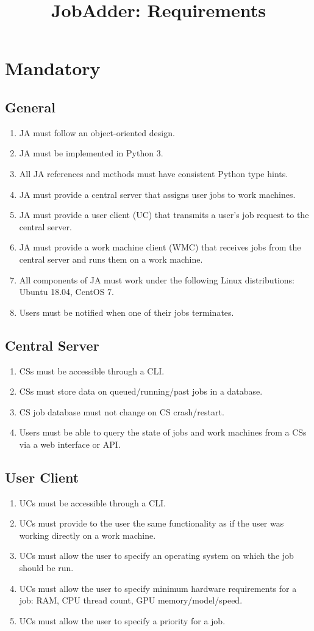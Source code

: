\documentclass[a4paper,10pt]{article}
\title{JobAdder: Requirements}
\author{}
\begin{document}
\maketitle

\section{Mandatory}
\subsection{General}
\begin{enumerate}
 \item JA must follow an object-oriented design.
 \item JA must be implemented in Python 3.
 \item All JA references and methods must have consistent Python type hints.
 \item JA must provide a central server that assigns user jobs to work machines.
 \item JA must provide a user client (UC) that transmits a user's job request to the central server.
 \item JA must provide a work machine client (WMC) that receives jobs from the central server and runs them on a work machine.
 \item All components of JA must work under the following Linux distributions: Ubuntu 18.04, CentOS 7.
 \item Users must be notified when one of their jobs terminates.
\end{enumerate}
\subsection{Central Server}
\begin{enumerate}
 \item CSs must be accessible through a CLI.
 \item CSs must store data on queued/running/past jobs in a database.
 \item CS job database must not change on CS crash/restart.
 \item Users must be able to query the state of jobs and work machines from a CSs via a web interface or API.
\end{enumerate}
\subsection{User Client}
\begin{enumerate}
 \item UCs must be accessible through a CLI.
 \item UCs must provide to the user the same functionality as if the user was working directly on a work machine.
 \item UCs must allow the user to specify an operating system on which the job should be run.
 \item UCs must allow the user to specify minimum hardware requirements for a job: RAM, CPU thread count, GPU memory/model/speed.
 \item UCs must allow the user to specify a priority for a job.
\end{enumerate}

\end{document}
